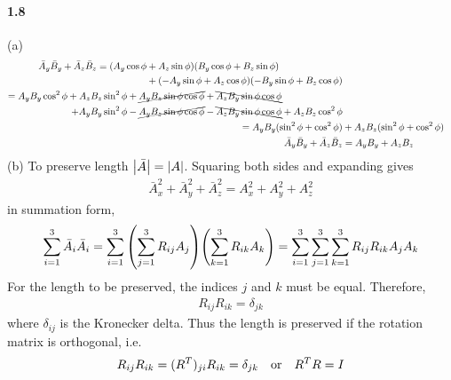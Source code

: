 \documentclass[../main.tex]{subfiles}
\begin{document}
\paragraph{1.8} (a)
\begin{align*}
    \begin{split}
        \bar{A}_y \bar{B}_y + \bar{A}_z \bar{B}_z =
        (A_y \cos{\phi} &+ A_z \sin{\phi})(B_y \cos{\phi} + B_z \sin{\phi}) \\
        &+ (-A_y \sin\phi + A_z \cos\phi)(-B_y \sin\phi + B_z \cos\phi)
    \end{split} \\
    \begin{split}
        = A_y B_y \cos^2\phi + A_z B_z \sin^2\phi
        &+ \cancel{A_y B_z \sin\phi\cos\phi} + \bcancel{A_z B_y \sin\phi\cos\phi} \\
        + A_y B_y \sin^2\phi &- \cancel{A_y B_z \sin\phi\cos\phi} 
        - \bcancel{A_z B_y \sin\phi\cos\phi} + A_z B_z \cos^2\phi
    \end{split} \\
    = A_y B_y (\sin^2\phi + \cos^2\phi) &+ A_z B_z (\sin^2\phi + \cos^2\phi) \\
    \bar{A}_y \bar{B}_y + \bar{A}_z \bar{B}_z &= A_y B_y + A_z B_z
\end{align*}
(b) To preserve length $\abs{\bar{A}} = \abs{A}$. Squaring both sides and expanding gives
\begin{align*}
    \bar{A}_x^2 + \bar{A}_y^2 + \bar{A}_z^2 = A_x^2 + A_y^2 + A_z^2
\end{align*}
in summation form,
\begin{align*}
    \sum_{i=1}^3 \bar{A}_i \bar{A}_i
    = \sum_{i=1}^3 \quantity(\sum_{j=1}^3 R_{ij} A_j) \quantity(\sum_{k=1}^3 R_{ik} A_k)
    = \sum_{i=1}^3 \sum_{j=1}^3 \sum_{k=1}^3 R_{ij} R_{ik} A_j A_k
\end{align*}
For the length to be preserved, the indices $j$ and $k$ must be equal. Therefore,
\begin{align*}
    R_{ij} R_{ik} = \delta_{jk}
\end{align*}
where $\delta_{ij}$ is the Kronecker delta. Thus the length is preserved if the rotation
matrix is orthogonal, i.e.
\begin{align*}
    R_{ij} R_{ik} = (R^T)_{ji} R_{ik} = \delta_{jk} \qor R^T R = I
\end{align*}
\end{document}
